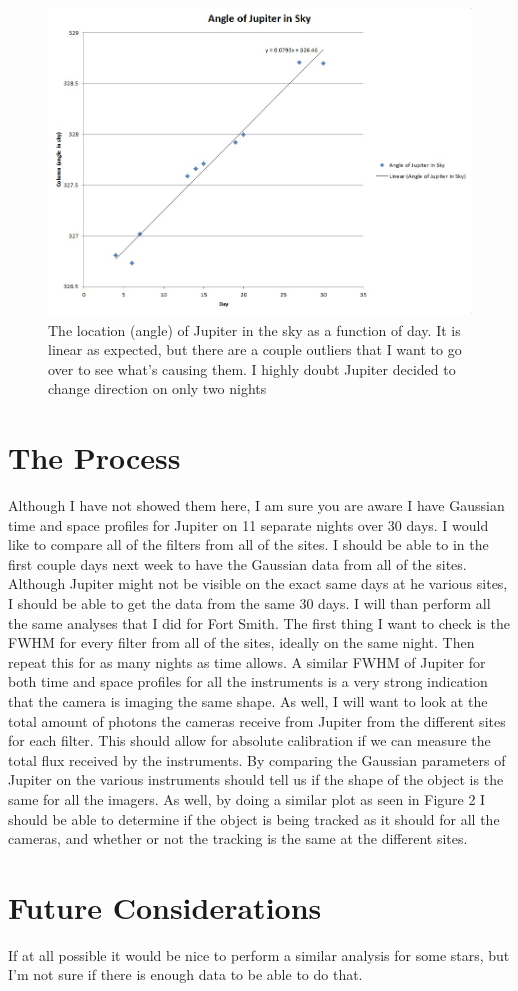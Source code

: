 \documentclass[11pt]{article}
\begin{document}
\begin{figure}[h!]
\includegraphics[scale=0.7]{jupiter_angle_vs_day.jpg}
\caption{The location (angle) of Jupiter in the sky as a function of day. It is linear as expected, but there are a couple outliers that I want to go over to see what's causing them. I highly doubt Jupiter decided to change direction on only two nights}
\end{figure}

\section{The Process}
\hspace{0.5cm}
Although I have not showed them here, I am sure you are aware I have Gaussian time and space profiles for Jupiter on 11 separate nights over 30 days. I would like to compare all of the filters from all of the sites. I should be able to in the first couple days next week to have the Gaussian data from all of the sites. Although Jupiter might not be visible on the exact same days at he various sites, I should be able to get the data from the same 30 days. I will than perform all the same analyses that I did for Fort Smith. The first thing I want to check is the FWHM for every filter from all of the sites, ideally on the same night. Then repeat this for as many nights as time allows. A similar FWHM of Jupiter for both time and space profiles for all the instruments is a very strong indication that the camera is imaging the same shape. As well, I will want to look at the total amount of photons the cameras receive from Jupiter from the different sites for each filter. This should allow for absolute calibration if we can measure the total flux received by the instruments. By comparing the Gaussian parameters of Jupiter on the various instruments should tell us if the shape of the object is the same for all the imagers. As well, by doing a similar plot as seen in Figure 2 I should be able to determine if the object is being tracked as it should for all the cameras, and whether or not the tracking is the same at the different sites. 


\section{Future Considerations}

If at all possible it would be nice to perform a similar analysis for some stars, but I'm not sure if there is enough data to be able to do that. 
\end{document}
